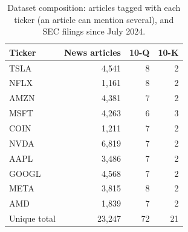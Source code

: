 \begin{table}[ht]
\centering
\caption{Dataset composition: articles tagged with each ticker (an article can mention several), and SEC filings since July 2024.}
\label{tab:data}
\begin{tabular}{lrrr}
\hline
Ticker & News articles & 10-Q & 10-K \\
\hline
TSLA & 4,541 & 8 & 2 \\
NFLX & 1,161 & 8 & 2 \\
AMZN & 4,381 & 7 & 2 \\
MSFT & 4,263 & 6 & 3 \\
COIN & 1,211 & 7 & 2 \\
NVDA & 6,819 & 7 & 2 \\
AAPL & 3,486 & 7 & 2 \\
GOOGL & 4,568 & 7 & 2 \\
META & 3,815 & 8 & 2 \\
AMD & 1,839 & 7 & 2 \\
\hline
Unique total & 23,247 & 72 & 21 \\
\hline
\end{tabular}
\end{table}
